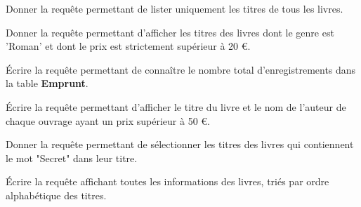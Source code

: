 \documentclass[a4paper, noanswers, addpoints, 12pt]{exam}
\begin{document}
\begin{questions}
\question[2] Donner la requête permettant de lister uniquement les titres de tous les livres.
\vfill

\question[2] Donner la requête permettant d'afficher les titres des livres dont le genre est 'Roman' et dont le prix est strictement supérieur à 20 €. 
\vfill

\question[2] Écrire la requête permettant de connaître le nombre total d'enregistrements dans la table \textbf{Emprunt}. 
\vfill

\question[2] Écrire la requête permettant d'afficher le titre du livre et le nom de l'auteur de chaque ouvrage ayant un prix supérieur à 50 €. 
\vspace{3cm}


\question[2] Donner la requête permettant de sélectionner les titres des livres qui contiennent le mot "Secret" dans leur titre.
\vfill

\question[2] Écrire la requête affichant toutes les informations des livres, triés par ordre alphabétique des titres. 
\vfill

\end{questions}
\end{document}
